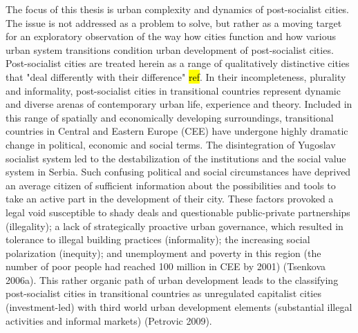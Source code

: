 \documentclass[11pt]{report}
\begin{document}
The focus of this thesis is urban complexity and dynamics of post-socialist cities. The issue is not addressed as a problem to solve, but rather as a moving target for an exploratory observation of the way how cities function and how various urban system transitions condition urban development of post-socialist cities.
\\
Post-socialist cities are treated herein as a range of qualitatively distinctive cities that "deal differently with their difference" \hl{ref}. In their incompleteness, plurality and informality, post-socialist cities in transitional countries represent dynamic and diverse arenas of contemporary urban life, experience and theory. Included in this range of spatially and economically developing surroundings, transitional countries in Central and Eastern Europe (CEE) have undergone highly dramatic change in political, economic and social terms. The disintegration of Yugoslav socialist system led to the destabilization of the institutions and the social value system in Serbia. Such confusing political and social circumstances have deprived an average citizen of sufficient information about the possibilities and tools to take an active part in the development of their city. These factors provoked a legal void susceptible to shady deals and questionable public-private partnerships (illegality); a lack of strategically proactive urban governance, which resulted in tolerance to illegal building practices (informality); the increasing social polarization (inequity); and unemployment and poverty in this region (the number of poor people had reached 100 million in CEE by 2001) (Tsenkova 2006a). This rather organic path of urban development leads to the classifying post-socialist cities in transitional countries as unregulated capitalist cities (investment-led) with third world urban development elements (substantial illegal activities and informal markets) (Petrovic 2009).
\\
\end{document}
